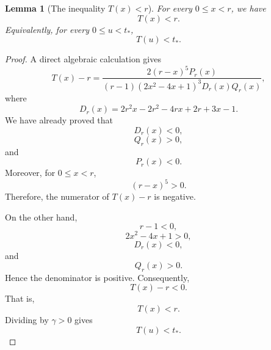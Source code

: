 \documentclass[11pt,a4paper]{article}
\numberwithin{equation}{section}
\numberwithin{table}{section}
\theoremstyle{plain}
\newtheorem{lemma}[theorem]{Lemma}
\theoremstyle{definition}\newtheorem{definition}[theorem]{Definition}
\theoremstyle{remark}\newtheorem{remark}[theorem]{Remark}
\begin{document}
\begin{lemma}[The inequality $T(x)<r$]\label{supp:s2lemma10}
For every $0\leq x<r$, we have 
\begin{equation*}
T(x)<r.
\end{equation*}
Equivalently, for every $0\leq u<t_*$, 
\begin{equation*}
T(u)<t_*.
\end{equation*}
\end{lemma}

\begin{proof}
A direct algebraic calculation gives 
\begin{equation*}
T(x)-r=\frac{2(r-x)^5P_r(x)}{(r-1)(2x^2-4x+1)^3D_r(x)Q_r(x)},
\end{equation*}
where 
\begin{equation*}
D_r(x)=2r^2x-2r^2-4rx+2r+3x-1.
\end{equation*}
We have already proved that 
\begin{equation*}
D_r(x)<0,
\end{equation*}
\begin{equation*}
Q_r(x)>0,
\end{equation*}
and 
\begin{equation*}
P_r(x)<0.
\end{equation*}
Moreover, for $0\leq x<r$, 
\begin{equation*}
(r-x)^5>0.
\end{equation*}
Therefore, the numerator of $T(x)-r$ is negative.

On the other hand, 
\begin{equation*}
r-1<0,
\end{equation*}
\begin{equation*}
2x^2-4x+1>0,
\end{equation*}
\begin{equation*}
D_r(x)<0,
\end{equation*}
and 
\begin{equation*}
Q_r(x)>0.
\end{equation*}
Hence the denominator is positive. Consequently, 
\begin{equation*}
T(x)-r<0.
\end{equation*}
That is, 
\begin{equation*}
T(x)<r.
\end{equation*}
Dividing by $\gamma>0$ gives 
\begin{equation*}
T(u)<t_*.
\end{equation*}
\end{proof}
\end{document}
